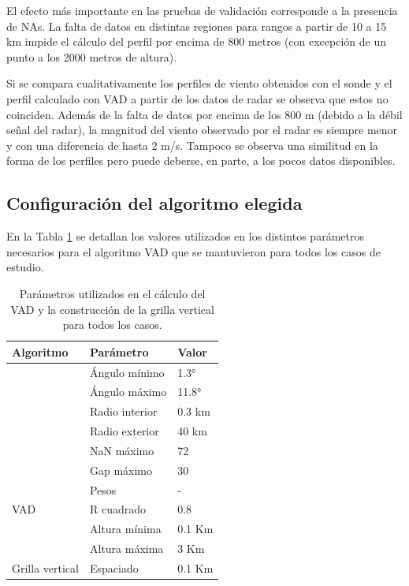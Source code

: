\documentclass[12pt,spanish,oneside, a4paper]{book}
\begin{document}
El efecto más importante en las pruebas de validación corresponde a la
presencia de NAs. La falta de datos en distintas regiones para rangos a
partir de 10 a 15 km impide el cálculo del perfil por encima de 800
metros (con excepción de un punto a los 2000 metros de altura).

Si se compara cualitativamente los perfiles de viento obtenidos con el
sonde y el perfil calculado con VAD a partir de los datos de radar se
observa que estos no coinciden. Además de la falta de datos por encima
de los 800 m (debido a la débil señal del radar), la magnitud del viento
observado por el radar es siempre menor y con una diferencia de hasta 2
m/s. Tampoco se observa una similitud en la forma de los perfiles pero
puede deberse, en parte, a los pocos datos disponibles.

\subsection{Configuración del algoritmo
elegida}\label{configuracion-del-algoritmo-elegida}

En la Tabla \ref{parametros} se detallan los valores utilizados en los
distintos parámetros necesarios para el algoritmo VAD que se mantuvieron
para todos los casos de estudio.

\begin{table}

\caption{\label{tab:parametros}Parámetros utilizados en el cálculo del VAD y la construcción de la grilla vertical para todos los casos. \label{parametros}}
\centering
\begin{tabular}[t]{lll}
\toprule
Algoritmo & Parámetro & Valor\\
\midrule
 & Ángulo mínimo & 1.3°\\
\cmidrule{2-3}
 & Ángulo máximo & 11.8°\\
\cmidrule{2-3}
 & Radio interior & 0.3 km\\
\cmidrule{2-3}
 & Radio exterior & 40 km\\
\cmidrule{2-3}
 & NaN máximo & 72\\
\cmidrule{2-3}
 & Gap máximo & 30\\
\cmidrule{2-3}
 & Pesos & -\\
\cmidrule{2-3}
\multirow{-8}{*}{\raggedright\arraybackslash VAD} & R cuadrado & 0.8\\
\cmidrule{1-3}
 & Altura mínima & 0.1 Km\\
\cmidrule{2-3}
 & Altura máxima & 3 Km\\
\cmidrule{2-3}
\multirow{-3}{*}{\raggedright\arraybackslash Grilla vertical} & Espaciado & 0.1 Km\\
\bottomrule
\end{tabular}
\end{table}
\end{document}
